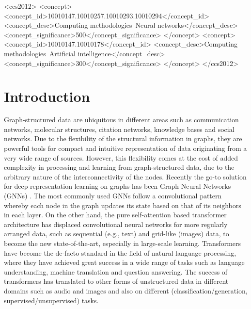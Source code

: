 \documentclass[sigconf,authorversion]{acmart}
\begin{document}
\begin{CCSXML}
  <ccs2012>
     <concept>
      <concept_id>10010147.10010257.10010293.10010294</concept_id>
      <concept_desc>Computing methodologies~Neural networks</concept_desc>
      <concept_significance>500</concept_significance>
      </concept>
     <concept>
         <concept_id>10010147.10010178</concept_id>
         <concept_desc>Computing methodologies~Artificial intelligence</concept_desc>
         <concept_significance>300</concept_significance>
         </concept>
   </ccs2012>
\end{CCSXML}
  




\maketitle

\section{Introduction}
Graph-structured data are ubiquitous in different areas such as communication networks, molecular structures, citation networks, knowledge bases and social networks. Due to the flexibility of the structural information in graphs, they are powerful tools for compact and intuitive representation of data originating from a very wide range of sources. However, this flexibility comes at the cost of added complexity in processing and learning from graph-structured data, due to the arbitrary nature of the interconnectivity of the nodes. Recently the go-to solution for deep representation learning on graphs has been Graph Neural Networks (GNNs) \citep{gori2005new,scarselli2008graph}. The most commonly used GNNs follow a convolutional pattern whereby each node in the graph updates its state based on that of its neighbors \cite{kipf2016semi,xu2018powerful} in each layer. On the other hand, the pure self-attention based transformer architecture \citep{vaswani2017attention} has displaced convolutional neural networks for more regularly arranged data, such as sequential (e.g., text) and grid-like (images) data, to become the new state-of-the-art, especially in large-scale learning. Transformers have become the de-facto standard in the field of natural language processing, where they have achieved great success in a wide range of tasks such as language understanding, machine translation and question answering. The success of transformers has translated to other forms of unstructured data in different domains such as audio \citep{child2019generating, li2019neural} and images \citep{chen2020generative, dosovitskiy2020image} and also on different (classification/generation, supervised/unsupervised) tasks.
\end{document}
